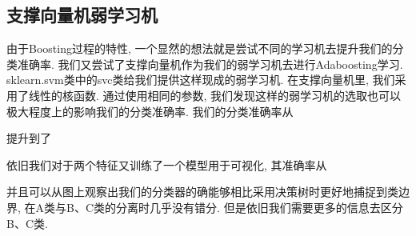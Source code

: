 \documentclass[lang=cn,11pt]{elegantpaper}
\begin{document}

\subsection{支撑向量机弱学习机}

由于Boosting过程的特性, 一个显然的想法就是尝试不同的学习机去提升我们的分类准确率. 我们又尝试了支撑向量机作为我们的弱学习机去进行Adaboosting学习. sklearn.svm类中的svc类给我们提供这样现成的弱学习机. 在支撑向量机里, 我们采用了线性的核函数. 通过使用相同的参数, 我们发现这样的弱学习机的选取也可以极大程度上的影响我们的分类准确率. 我们的分类准确率从%

提升到了

依旧我们对于两个特征又训练了一个模型用于可视化, 其准确率从

并且可以从图上观察出我们的分类器的确能够相比采用决策树时更好地捕捉到类边界, 在A类与B、C类的分离时几乎没有错分. 但是依旧我们需要更多的信息去区分B、C类.



\newpage
\nocite{*}



\end{document}
